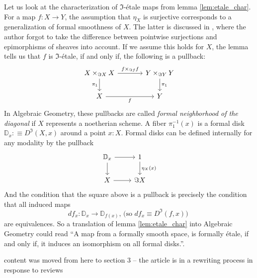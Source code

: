 \documentclass[9pt,twosided]{amsart}
\newcommand{\bD}{\mathbb D}
\newcommand{\todo}[1]{{\color{red}#1}}
\newcommand{\ignore}[1]{}
\begin{document}
Let us look at the characterization of $\Im$-étale maps from lemma \ref{lem:etale_char}.
For a map $f:X\to Y$, the assumption that $\eta_X$ is surjective corresponds to a generalization of formal smoothness of $X$.
The latter is discussed in \cite[Section 4.4]{wellen-thesis}, where the author forgot to take the difference between pointwise surjections and epimorphisms of sheaves into account.
If we assume this holds for $X$, the lemma tells us that $f$ is $\Im$-étale, if and only if, the following is a pullback:
\begin{equation*}
\begin{tikzcd}[column sep=large]
X\times_{\Im X} X \arrow[d,swap,"\pi_1"] \arrow[r,"{f\times_{\Im f} f}"] & Y\times_{\Im Y} Y \arrow[d,"\pi_1"] \\
X \arrow[r,swap,"f"] & Y
\end{tikzcd}
\end{equation*}
In Algebraic Geometry, these pullbacks are called \emph{formal neighborhood of the diagonal} if $X$ represents a noetherian scheme.
A fiber $\pi_1^{-1}(x)$ is a formal disk $\bD_x:\equiv D^\Im(X,x)$ around a point $x:X$.
Formal disks can be defined internally for any modality by the pullback
\begin{equation*}
  \begin{tikzcd}
    \bD_x\arrow[r]\arrow[d] & 1\arrow[d, "\eta_X(x)"] \\
    X \arrow[r] & \Im X
  \end{tikzcd}
\end{equation*}
And the condition that the square above is a pullback is precisely the condition that all induced maps
\[ df_x:\bD_x\to\bD_{f(x)}\text{, (so $df_x\equiv D^\Im(f,x)$) }\]
are equivalences. So a translation of lemma \ref{lem:etale_char} into Algebraic Geometry could read ``A map from a formally smooth space, is formally étale, if and only if, it induces an isomorphism on all formal disks.''.

\todo{content was moved from here to section 3 -- the article is in a rewriting process in response to reviews}
\ignore{
This could be summarized in the statement that for a formally étale $f:X\to Y$ and any $x:X$, we have a pullback square:
\begin{equation*}
  \begin{tikzcd}
    \bD_{f(x)}\times(\Im f)^{-1}(\tilde{y})\arrow[r]\arrow[d] & X\arrow[d, "f"] \\
    \bD_{f(x)} \arrow[r] & Y
  \end{tikzcd}
\end{equation*}
which means that ``a formally étale map is trivialized over any formal disk''.
}
\end{document}
